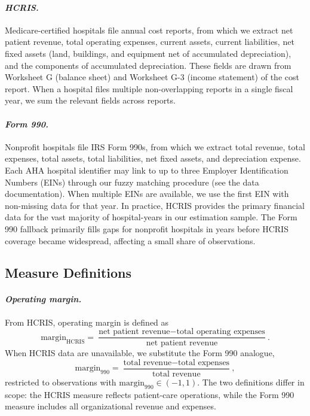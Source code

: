 \documentclass[a4paper, 12pt]{article}
\begin{document}
\paragraph{\textit{HCRIS.}} Medicare-certified hospitals file annual cost reports, from which we extract net patient revenue, total operating expenses, current assets, current liabilities, net fixed assets (land, buildings, and equipment net of accumulated depreciation), and the components of accumulated depreciation. These fields are drawn from Worksheet G (balance sheet) and Worksheet G-3 (income statement) of the cost report. When a hospital files multiple non-overlapping reports in a single fiscal year, we sum the relevant fields across reports.

\paragraph{\textit{Form 990.}} Nonprofit hospitals file IRS Form 990s, from which we extract total revenue, total expenses, total assets, total liabilities, net fixed assets, and depreciation expense. Each AHA hospital identifier may link to up to three Employer Identification Numbers (EINs) through our fuzzy matching procedure (see the data documentation). When multiple EINs are available, we use the first EIN with non-missing data for that year. In practice, HCRIS provides the primary financial data for the vast majority of hospital-years in our estimation sample. The Form 990 fallback primarily fills gaps for nonprofit hospitals in years before HCRIS coverage became widespread, affecting a small share of observations.

\subsection{Measure Definitions}

\paragraph{\textit{Operating margin.}} From HCRIS, operating margin is defined as
$$
\text{margin}_{\text{HCRIS}} = \frac{\text{net patient revenue} - \text{total operating expenses}}{\text{net patient revenue}}.
$$
When HCRIS data are unavailable, we substitute the Form 990 analogue,
$$
\text{margin}_{990} = \frac{\text{total revenue} - \text{total expenses}}{\text{total revenue}},
$$
restricted to observations with $\text{margin}_{990} \in (-1, 1)$. The two definitions differ in scope: the HCRIS measure reflects patient-care operations, while the Form 990 measure includes all organizational revenue and expenses.
\end{document}
